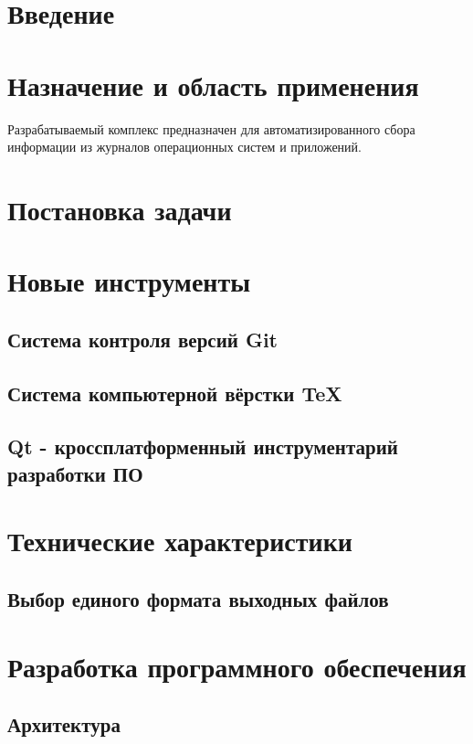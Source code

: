 \documentclass[russian,utf8,14pt,simple]{eskdtext}
\begin{document}
\newpage
{}
\section{Введение}


\section{Назначение и область применения}
Разрабатываемый комплекс предназначен для автоматизированного сбора информации из журналов операционных систем и приложений.
\section{Постановка задачи}
\setcounter{figure}{0}

\section{Новые инструменты}
\setcounter{figure}{0}
\subsection{Система контроля версий Git}

\subsection{Система компьютерной вёрстки \TeX}

\subsection{Qt - кроссплатформенный инструментарий разработки ПО}


\section{Технические характеристики}

\subsection{Выбор единого формата выходных файлов}


\section{Разработка программного обеспечения}
\setcounter{figure}{0}

\subsection{Архитектура}
\setcounter{figure}{0}

\end{document}
